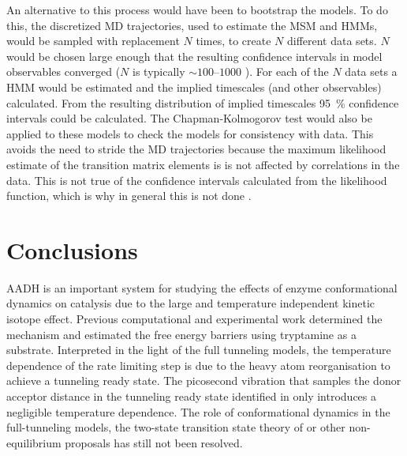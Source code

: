 An alternative to this process would have been to bootstrap the models. To do this, the discretized MD trajectories, used to estimate the MSM and HMMs, would be sampled with replacement $N$ times, to create $N$ different data sets.  $N$ would be chosen large enough that the resulting confidence intervals in model observables converged ($N$ is typically $\sim\numrange{100}{1000}$ \cite{efronIntroductionBootstrap1993}). For each of the $N$ data sets a HMM would be estimated and the implied timescales (and other observables) calculated. From the resulting distribution of implied timescales \SI{95}{\percent} confidence intervals could be calculated. The Chapman-Kolmogorov test would also be applied to these models to check the models for consistency with data. This avoids the need to stride the MD trajectories because the maximum  likelihood estimate of the transition matrix elements is is not affected by correlations in the data. This is not true of the confidence intervals calculated from the likelihood function, which is why in general this is not done \cite{prinzMarkovModelsMolecular2011}.  
 


\section{Conclusions}\label{sec:aadh_conclusions}
AADH is an important system for studying the effects of enzyme conformational dynamics on catalysis due to the large and temperature independent kinetic isotope effect. Previous computational and experimental work determined the mechanism and estimated the free energy barriers using tryptamine as a substrate. Interpreted in the light of the full tunneling models, the temperature dependence of the rate limiting step is due to the heavy atom reorganisation to achieve a tunneling ready state. The picosecond vibration that samples the donor acceptor distance in the tunneling ready state identified in \cite{johannissenProtonTunnelingAromatic2007} only introduces a negligible temperature dependence. The role of conformational dynamics in the full-tunneling models, the two-state transition state theory of \cite{glowackiProteinDynamicsEnzyme2012a} or other non-equilibrium proposals has still not been resolved. 

